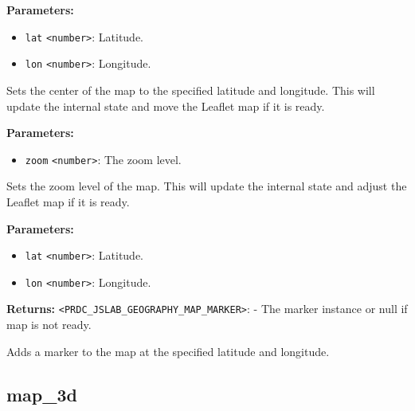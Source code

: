 \documentclass[12pt,a4paper]{article}
\begin{document}
\vspace{5mm}
\noindent {}


\noindent \textbf{Parameters:}
\begin{itemize}
  \item \texttt{lat} \texttt{<number>}: Latitude.
  \item \texttt{lon} \texttt{<number>}: Longitude.
\end{itemize}

\noindent Sets the center of the map to the specified latitude and longitude.
This will update the internal state and move the Leaflet map if it is ready.

\vspace{5mm}
\noindent {}


\noindent \textbf{Parameters:}
\begin{itemize}
  \item \texttt{zoom} \texttt{<number>}: The zoom level.
\end{itemize}

\noindent Sets the zoom level of the map.
This will update the internal state and adjust the Leaflet map if it is ready.

\vspace{5mm}
\noindent {}


\noindent \textbf{Parameters:}
\begin{itemize}
  \item \texttt{lat} \texttt{<number>}: Latitude.
  \item \texttt{lon} \texttt{<number>}: Longitude.
\end{itemize}

\noindent \textbf{Returns:} \texttt{<PRDC\_JSLAB\_GEOGRAPHY\_MAP\_MARKER>}: - The marker instance or null if map is not ready.

\noindent Adds a marker to the map at the specified latitude and longitude.


\subsection{map\_3d}
\vspace{5mm}
\noindent {}
\end{document}
